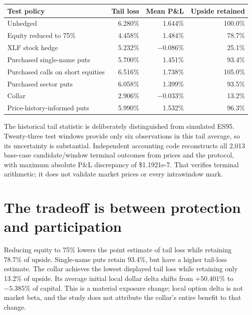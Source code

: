 \documentclass[11pt,a4paper]{article}
\begin{document}
\begin{center}\small
\begin{tabular}{@{}p{.45\linewidth}rrr@{}}\toprule
Test policy & Tail loss & Mean P\&L & Upside retained\\\midrule
Unhedged & 6.280\% & 1.644\% & 100.0\%\\
Equity reduced to 75\% & 4.458\% & 1.484\% & 78.7\%\\
XLF stock hedge & 5.232\% & $-0.086$\% & 25.1\%\\
Purchased single-name puts & 5.700\% & 1.451\% & 93.4\%\\
Purchased calls on short equities & 6.516\% & 1.738\% & 105.0\%\\
Purchased sector puts & 6.058\% & 1.399\% & 93.5\%\\
Collar & 2.906\% & $-0.033$\% & 13.2\%\\
Price-history-informed puts & 5.990\% & 1.532\% & 96.3\%\\\bottomrule
\end{tabular}\end{center}

The historical tail statistic is deliberately distinguished from simulated ES95. Twenty-three test windows provide only six observations in this tail average, so its uncertainty is substantial. Independent accounting code reconstructs all 2,013 base-case candidate/window terminal outcomes from prices and the protocol, with maximum absolute P\&L discrepancy of \$1.1921e-7. That verifies terminal arithmetic; it does not validate market prices or every intrawindow mark.

\nextpage
\section*{The tradeoff is between protection and participation}
Reducing equity to 75\% lowers the point estimate of tail loss while retaining 78.7\% of upside. Single-name puts retain 93.4\%, but have a higher tail-loss estimate. The collar achieves the lowest displayed tail loss while retaining only 13.2\% of upside. Its average initial local dollar delta shifts from $+50.401$\% to $-5.385$\% of capital. This is a material exposure change; local option delta is not market beta, and the study does not attribute the collar's entire benefit to that change.
\end{document}
